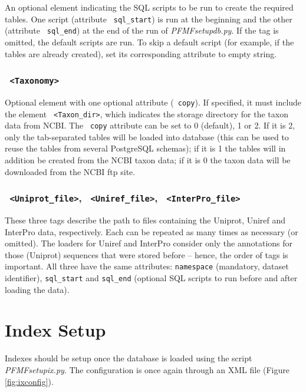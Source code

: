 \documentclass[10pt,letter]{article}
\begin{document}
An optional element indicating the SQL scripts to be run to create the required tables. One script (attribute \texttt{ sql\_start}) is run at the beginning and the other (attribute \texttt{ sql\_end}) at the end of the run of {\it PFMFsetupdb.py}. If the tag is omitted, the default scripts are run. To skip a default script (for example, if the tables are already created), set its corresponding attribute to empty string.

\subsubsection*{\texttt{ <Taxonomy>}}

Optional element with one optional attribute (\texttt{ copy}). If specified, it must include the element \texttt{ <Taxon\_dir>}, which indicates the storage directory for the taxon data from NCBI. The \texttt{ copy} attribute can be set to 0 (default), 1 or 2. If it is 2, only the tab-separated tables will be loaded into database (this can be used to reuse the tables from several PostgreSQL schemas); if it is 1 the tables will in addition be created from the NCBI taxon data; if it is 0 the taxon data will be downloaded from the NCBI ftp site. 

\subsubsection*{\texttt{ <Uniprot\_file>}, \texttt{ <Uniref\_file>}, \texttt{ <InterPro\_file>}}

These three tags describe the path to files containing the Uniprot, Uniref and InterPro data, respectively. Each can be repeated as many times as necessary (or omitted). The loaders for Uniref and InterPro consider only the annotations for those (Uniprot) sequences that were stored before -- hence, the order of tags is important. All three have the same attributes: \texttt{namespace} (mandatory, dataset identifier), \texttt{sql\_start} and \texttt{sql\_end} (optional SQL scripts to run before and after loading the data).

\section{Index Setup}

Indexes should be setup once the database is loaded using the script {\it PFMFsetupix.py}. The configuration is once again through an XML file (Figure \ref{fig:ixconfig}).
\end{document}
